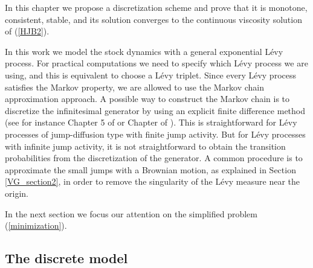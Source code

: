 In this chapter we propose a discretization scheme and prove that it is monotone, consistent, stable, and its solution converges to the continuous viscosity
solution of (\ref{HJB2}).

In this work we model the stock dynamics with a general exponential Lévy process. For practical computations we need to specify
which Lévy process we are using, and this is equivalent to choose a Lévy triplet.
Since every L\'evy process satisfies the Markov property, we are allowed to use the Markov chain approximation approach.  
A possible way to construct the Markov chain is to discretize the infinitesimal generator by using an explicit finite difference method
(see for instance Chapter 5 of \cite{Kushner} or Chapter  of \cite{FlemingSoner}).
This is straightforward for 
Lévy processes of jump-diffusion type with finite jump activity. 
But for Lévy processes with infinite jump activity, it is not straightforward to obtain the transition probabilities from the discretization of the generator.
A common procedure is to approximate the small jumps with a Brownian motion, as explained in Section \ref{VG_section2}, in order to remove
the singularity of the Lévy measure near the origin. 

\noindent
In the next section we focus our attention on the simplified problem (\ref{minimization}). 


\subsection{The discrete model}\label{discrete_model}

